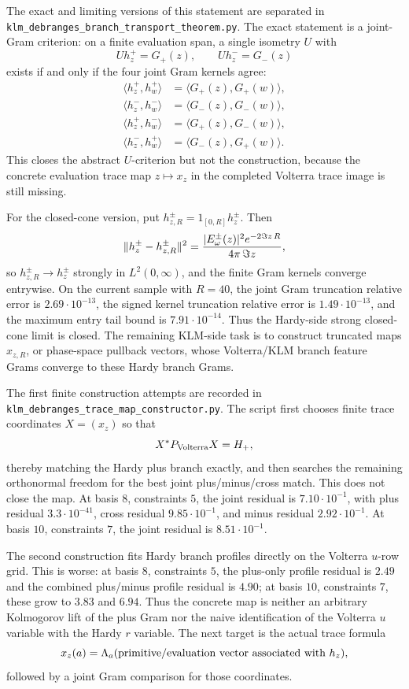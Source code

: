 \documentclass[11pt]{article}
\begin{document}
The exact and limiting versions of this statement are separated in
\texttt{klm\_debranges\_branch\_transport\_theorem.py}.  The exact statement
is a joint-Gram criterion: on a finite evaluation span, a single isometry
\(U\) with
\[
  U h_z^+=G_+(z),\qquad U h_z^-=G_-(z)
\]
exists if and only if the four joint Gram kernels agree:
\[
\begin{aligned}
  \langle h_z^+,h_w^+\rangle&=\langle G_+(z),G_+(w)\rangle,\\
  \langle h_z^-,h_w^-\rangle&=\langle G_-(z),G_-(w)\rangle,\\
  \langle h_z^+,h_w^-\rangle&=\langle G_+(z),G_-(w)\rangle,\\
  \langle h_z^-,h_w^+\rangle&=\langle G_-(z),G_+(w)\rangle .
\end{aligned}
\]
This closes the abstract \(U\)-criterion but not the construction, because the
concrete evaluation trace map \(z\mapsto x_z\) in the completed Volterra trace
image is still missing.

For the closed-cone version, put \(h_{z,R}^\pm=1_{[0,R]}h_z^\pm\).  Then
\[
  \|h_z^\pm-h_{z,R}^\pm\|^2
  ={ |E_\omega^\pm(z)|^2 e^{-2\Im z\,R}\over 4\pi\,\Im z},
\]
so \(h_{z,R}^\pm\to h_z^\pm\) strongly in \(L^2(0,\infty)\), and the finite
Gram kernels converge entrywise.  On the current sample with \(R=40\), the
joint Gram truncation relative error is \(2.69\cdot10^{-13}\), the signed
kernel truncation relative error is \(1.49\cdot10^{-13}\), and the maximum
entry tail bound is \(7.91\cdot10^{-14}\).  Thus the Hardy-side strong
closed-cone limit is closed.  The remaining KLM-side task is to construct
truncated maps \(x_{z,R}\), or phase-space pullback vectors, whose
Volterra/KLM branch feature Grams converge to these Hardy branch Grams.

The first finite construction attempts are recorded in
\texttt{klm\_debranges\_trace\_map\_constructor.py}.  The script first chooses
finite trace coordinates \(X=(x_z)\) so that
\[
  X^\ast P_{\rm Volterra}X=H_+,
\]
thereby matching the Hardy plus branch exactly, and then searches the
remaining orthonormal freedom for the best joint plus/minus/cross match.  This
does not close the map.  At basis \(8\), constraints \(5\), the joint residual
is \(7.10\cdot10^{-1}\), with plus residual \(3.3\cdot10^{-41}\), cross
residual \(9.85\cdot10^{-1}\), and minus residual \(2.92\cdot10^{-1}\).  At
basis \(10\), constraints \(7\), the joint residual is \(8.51\cdot10^{-1}\).

The second construction fits Hardy branch profiles directly on the Volterra
\(u\)-row grid.  This is worse: at basis \(8\), constraints \(5\), the
plus-only profile residual is \(2.49\) and the combined plus/minus profile
residual is \(4.90\); at basis \(10\), constraints \(7\), these grow to
\(3.83\) and \(6.94\).  Thus the concrete map is neither an arbitrary
Kolmogorov lift of the plus Gram nor the naive identification of the Volterra
\(u\) variable with the Hardy \(r\) variable.  The next target is the actual
trace formula
\[
  x_z(a)=\Lambda_a(\hbox{primitive/evaluation vector associated with }h_z),
\]
followed by a joint Gram comparison for those coordinates.
\end{document}
